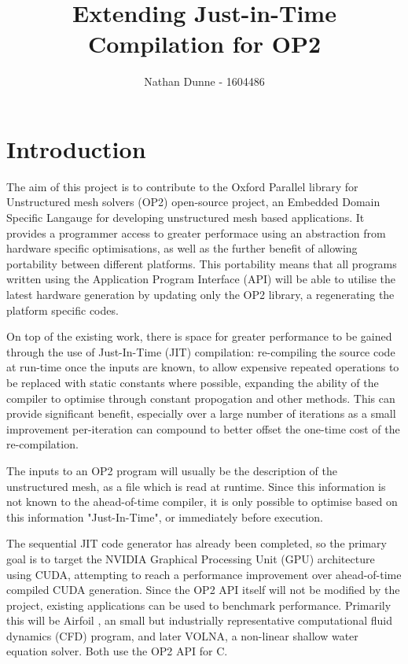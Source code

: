 \documentclass[11pt]{article}
\title{Extending Just-in-Time Compilation for OP2}
\author{Nathan Dunne - 1604486}
\begin{document}
\maketitle

\section*{Introduction}
The aim of this project is to contribute to the Oxford Parallel library for Unstructured mesh solvers (OP2) open-source project\cite{OP2rep}, an Embedded Domain Specific Langauge for developing unstructured mesh based applications. It provides a programmer access to greater performace using an abstraction from hardware specific optimisations, as well as the further benefit of allowing portability between different platforms. This portability means that all programs written using the Application Program Interface (API) will be able to utilise the latest hardware generation by updating only the OP2 library, a regenerating the platform specific codes.
\par On top of the existing work, there is space for greater performance to be gained through the use of Just-In-Time (JIT) compilation: re-compiling the source code at run-time once the inputs are known, to allow expensive repeated operations to be replaced with static constants where possible, expanding the ability of the compiler to optimise through constant propogation and other methods. This can provide significant benefit, especially over a large number of iterations as a small improvement per-iteration can compound to better offset the one-time cost of the re-compilation.
\par The inputs to an OP2 program will usually be the description of the unstructured mesh, as a file which is read at runtime. Since this information is not known to the ahead-of-time compiler, it is only possible to optimise based on this information "Just-In-Time", or immediately before execution.
\par The sequential JIT code generator has already been completed, so the primary goal is to target the NVIDIA Graphical Processing Unit (GPU) architecture using CUDA, attempting to reach a performance improvement over ahead-of-time compiled CUDA generation. Since the OP2 API itself will not be modified by the project, existing applications can be used to benchmark performance. Primarily this will be Airfoil \cite{airfoil}, an small but industrially representative computational fluid dynamics (CFD) program, and later VOLNA\cite{volna}, a non-linear shallow water equation solver. Both use the OP2 API for C.
\end{document}
